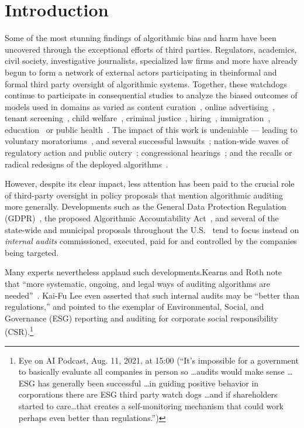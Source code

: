 \documentclass[sigconf]{acmart}
\begin{document}
\maketitle

\section{Introduction}
Some of the most stunning findings of algorithmic bias and harm have been uncovered through the exceptional efforts of third parties. Regulators, academics, civil society, investigative journalists, specialized law firms and more have already begun to form a network of external actors participating in theinformal and formal third party oversight of algorithmic systems. Together, these watchdogs continue to participate in consequential studies to analyze the biased outcomes of models used in domains as varied as content curation~\cite{sweeney2013discrimination}, online advertising~\cite{kofman2019facebook}, tenant screening~\cite{rosen2021racial,markup1kirchner2020access}, child welfare~\cite{chouldechova2018case}, criminal justice~\cite{eckhouse2019layers,angwin2016machine,buolamwini2018gender,snow2018,grother2019face}, hiring~\cite{raghavan2020mitigating}, immigration~\cite{FOX2}, education~\cite{FOX1} or public health~\cite{coston2021leveraging, obermeyer2019dissecting}. 
The impact of this work is undeniable --- leading to voluntary moratoriums~\cite{heilweil2020big}, and several successful lawsuits~\cite{sherwinfacebook, spinks2019contemporary}; nation-wide waves of regulatory action and public outcry~\cite{fban}; congressional hearings~\cite{markupimpact}; and the recalls or radical redesigns of the deployed algorithms~\cite{wilson2021building, raji2019actionable, raji2020saving, chouldechova2018case}.

However, despite its clear impact, less attention has been paid to the crucial role of third-party oversight in policy proposals that mention algorithmic auditing more generally. Developments such as the General Data Protection Regulation (GDPR)~\cite{voigt2017eu}, the proposed Algorithmic Accountability Act~\cite{maccarthy2019examination}, and several of the state-wide and municipal proposals throughout the U.S.~\cite{maurernew2021} tend to focus instead on \emph{internal audits} commissioned, executed, paid for and controlled by the companies being targeted.

Many experts nevertheless applaud such developments.Kearns and Roth note that “more systematic, ongoing, and legal ways of auditing algorithms are needed”~\cite{kearns2020ethical}. Kai-Fu Lee even asserted that such internal audits may be “better than regulations,” and pointed to the exemplar of Environmental, Social, and Governance (ESG) reporting and auditing for corporate social responsibility (CSR).\footnote{Eye on AI Podcast, Aug. 11, 2021, at 15:00 (“It’s impossible for a government to basically evaluate all companies in person so \dots audits would make sense \dots ESG has generally been successful \dots in guiding positive behavior in corporations \dotsIf there are ESG third party watch dogs \dots and if shareholders started to care\dots that creates a self-monitoring mechanism that could work perhaps even better than regulations.”)} 
\end{document}
